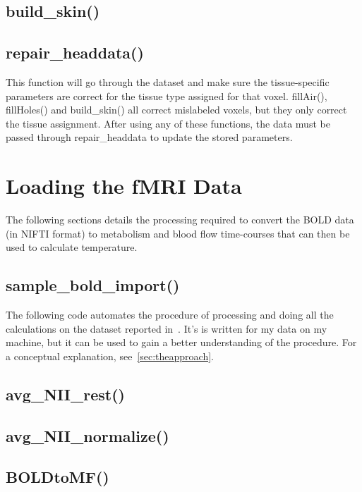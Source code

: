 \subsection{build\_skin()}
\label{ass:buildskin}

\subsection{repair\_headdata()}
\label{ass:repairheaddata}
This function will go through the dataset and make sure the tissue-specific parameters are correct for the tissue type assigned for that voxel.  fillAir(), fillHoles() and build\_skin() all correct mislabeled voxels, but they only correct the tissue assignment.  After using any of these functions, the data must be passed through repair\_headdata to update the stored parameters.

\clearpage
\section{Loading the fMRI Data}
\label{sec:fmriprocessing}
The following sections details the processing required to convert the BOLD data (in NIFTI format) to metabolism and blood flow time-courses that can then be used to calculate temperature.
\subsection{sample\_bold\_import()}
The following code automates the procedure of processing and doing all the calculations on the dataset reported in~\citet{dhamala}.  It's is written for my data on my machine, but it can be used to gain a better understanding of the procedure. For a conceptual explanation, see~\cref{sec:theapproach}.

\subsection{avg\_NII\_rest()}

\subsection{avg\_NII\_normalize()}

\subsection{BOLDtoMF()}

